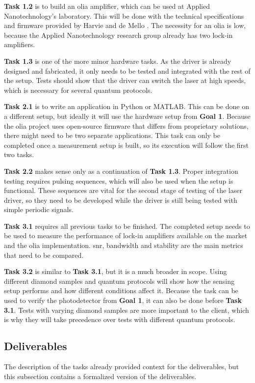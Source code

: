 \textbf{Task 1.2} is to build an \gls{olia} amplifier, which can be used at Applied Nanotechnology's laboratory. This will be done with the technical specifications and firmware provided by Harvie and de Mello \cite{harvie2023olia}. The necessity for an \gls{olia} is low, because the Applied Nanotechnology research group already has two lock-in amplifiers.


\textbf{Task 1.3} is one of the more minor hardware tasks. As the driver is already designed and fabricated, it only needs to be tested and integrated with the rest of the setup. Tests should show that the driver can switch the laser at high speeds, which is necessary for several quantum protocols.

\textbf{Task 2.1} is to write an application in Python or MATLAB. This can be done on a different setup, but ideally it will use the hardware setup from \textbf{Goal 1}. Because the \gls{olia} project uses open-source firmware that differs from proprietary solutions, there might need to be two separate applications. This task can only be completed once a measurement setup is built, so its execution will follow the first two tasks.

\textbf{Task 2.2} makes sense only as a continuation of \textbf{Task 1.3}. Proper integration testing requires pulsing sequences, which will also be used when the setup is functional. These sequences are vital for the second stage of testing of the laser driver, so they need to be developed while the driver is still being tested with simple periodic signals.

\textbf{Task 3.1} requires all previous tasks to be finished. The completed setup needs to be used to measure the performance of lock-in amplifiers available on the market and the \gls{olia} implementation. \gls{snr}, bandwidth and stability are the main metrics that need to be compared.

\textbf{Task 3.2} is similar to \textbf{Task 3.1}, but it is a much broader in scope. Using different diamond samples and quantum protocols will show how the sensing setup performs and how different conditions affect it. Because the task can be used to verify the photodetector from \textbf{Goal 1}, it can also be done before \textbf{Task 3.1}. Tests with varying diamond samples are more important to the client, which is why they will take precedence over tests with different quantum protocols.


\subsection{Deliverables}
The description of the tasks already provided context for the deliverables, but this subsection contains a formalized version of the deliverables.

